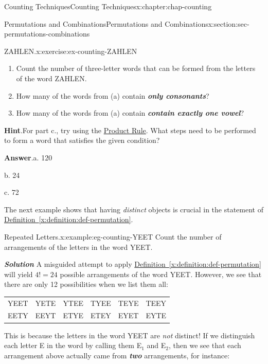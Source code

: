 \documentclass[oneside,10pt,]{book}
\newcommand{\blocktitlefont}{\relax}
\newcommand{\tabularfont}{\relax}
\newcommand{\xreffont}{\relax}
\newcommand{\alert}[1]{\textbf{\textit{#1}}}
\numberwithin{equation}{section}
\begin{document}
\begin{chapterptx}{Counting Techniques}{}{Counting Techniques}{}{}{x:chapter:chap-counting}
\begin{sectionptx}{Permutations and Combinations}{}{Permutations and Combinations}{}{}{x:section:sec-permutations-combinations}
\begin{inlineexercise}{ZAHLEN.}{x:exercise:ex-counting-ZAHLEN}%
%
\begin{enumerate}[label=(\alph*)]
\item{}Count the number of three-letter words that can be formed from the letters of the word ZAHLEN.%
\item{}How many of the words from (a) contain \alert{only consonants}?%
\item{}How many of the words from (a) contain \alert{contain exactly one vowel}?%
\end{enumerate}
%
\par\smallskip%
\noindent\textbf{\blocktitlefont Hint}.\hypertarget{g:hint:id325453}{}\quad{}For part c., try using the \hyperref[x:principle:prin-prod-rule]{Product Rule}. What steps need to be performed to form a word that satisfies the given condition?%
\par\smallskip%
\noindent\textbf{\blocktitlefont Answer}.\hypertarget{g:answer:id325513}{}\quad{}a. 120%
\par
b. 24%
\par
c. 72%
\end{inlineexercise}
The next example shows that having \emph{distinct} objects is crucial in the statement of \hyperref[x:definition:def-permutation]{Definition~{\xreffont\ref{x:definition:def-permutation}}}.%
\begin{example}{Repeated Letters.}{x:example:eg-counting-YEET}%
Count the number of arrangements of the letters in the word YEET.%
\par
\alert{Solution} A misguided attempt to apply \hyperref[x:definition:def-permutation]{Definition~{\xreffont\ref{x:definition:def-permutation}}} will yield \(4! = 24\) possible arrangements of the word YEET. However, we see that there are only 12 possibilities when we list them all:%
\begin{sidebyside}{1}{0.2}{0.2}{0}%
\begin{sbspanel}{0.6}%
{\centering%
{\tabularfont%
\begin{tabular}{llllll}
YEET&YETE&YTEE&TYEE&TEYE&TEEY\tabularnewline[0pt]
EETY&EEYT&ETYE&ETEY&EYET&EYTE
\end{tabular}
}%
\par}
\end{sbspanel}%
\end{sidebyside}%
\par
This is because the letters in the word YEET are \emph{not} distinct! If we distinguish each letter E in the word by calling them E\(_1\) and E\(_2\), then we see that each arrangement above actually came from \alert{two} arrangements, for instance:%

\end{example}
\end{sectionptx}
\end{chapterptx}
\end{document}
